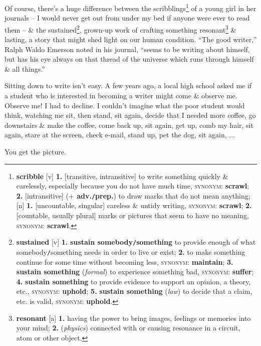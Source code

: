 \documentclass[oneside]{book}
\numberwithin{equation}{section}
\begin{document}
Of course, there's a huge difference between the scribblings\footnote{\textbf{scribble} [v] \textbf{1.} [transitive, intransitive] to write something quickly \& carelessly, especially because you do not have much time, \textsc{synonym}: \textbf{scrawl}; \textbf{2.} [intransitive] (\textbf{$+$ adv.\texttt{/}prep.}) to draw marks that do not mean anything; [n] \textbf{1.} [uncountable, singular] careless \& untidy writing, \textsc{synonym}: \textbf{scrawl}; \textbf{2.} [countable, usually plural] marks or pictures that seem to have no meaning, \textsc{synonym}: \textbf{scrawl}.} of a young girl in her journals -- I would never get out from under my bed if anyone were ever to read them -- \& the sustained\footnote{\textbf{sustained} [v] \textbf{1.} \textbf{sustain somebody\texttt{/}something} to provide enough of what somebody\texttt{/}something needs in order to live or exist; \textbf{2.} to make something continue for some time without becoming less, \textsc{synonym}: \textbf{maintain}; \textbf{3.} \textbf{sustain something} (\textit{formal}) to experience something bad, \textsc{synonym}: \textbf{suffer}; \textbf{4.} \textbf{sustain something} to provide evidence to support an opinion, a theory, etc., \textsc{synonym}: \textbf{uphold}; \textbf{5.} \textbf{sustain something} (\textit{law}) to decide that a claim, etc. is valid, \textsc{synonym}: \textbf{uphold}.}, grown-up work of crafting something resonant\footnote{\textbf{resonant} [a] \textbf{1.} having the power to bring images, feelings or memories into your mind; \textbf{2.} (\textit{physics}) connected with or causing resonance in a circuit, atom or other object.} \& lasting, a story that might shed light on our human condition. ``The good writer,'' Ralph Waldo Emerson noted in his journal, ``seems to be writing about himself, but has his eye always on that thread of the universe which runs through himself \& all things.''

Sitting down to write isn't easy. A few years ago, a local high school asked me if a student who is interested in becoming a writer might come \& observe me. Observe me! I had to decline. I couldn't imagine what the poor student would think, watching me sit, then stand, sit again, decide that I needed more coffee, go downstairs \& make the coffee, come back up, sit again, get up, comb my hair, sit again, stare at the screen, check e-mail, stand up, pet the dog, sit again, $\ldots$

You get the picture.
\end{document}
